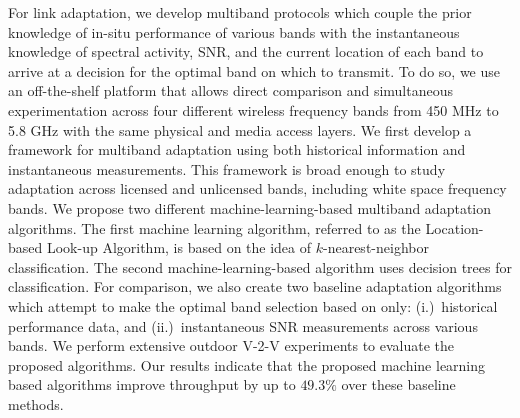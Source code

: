 For link adaptation, we develop multiband protocols which couple the prior knowledge 
of in-situ performance of various bands with the instantaneous knowledge of spectral 
activity, SNR, and the current location of each band to arrive at a decision for the 
optimal band on which to transmit. To do so, we use an off-the-shelf platform that 
allows direct comparison and simultaneous experimentation across four different 
wireless frequency bands from 450 MHz to 5.8 GHz with the same physical and media 
access layers. We first develop a framework for multiband adaptation using both historical 
information and instantaneous measurements. This framework is broad enough to study 
adaptation across licensed and unlicensed bands, including white space frequency bands. 
We propose two different machine-learning-based multiband adaptation algorithms. The 
first machine learning algorithm, referred to as the Location-based Look-up Algorithm, 
is based on the idea of $k$-nearest-neighbor classification. The second machine-learning-based 
algorithm uses decision trees for classification. For comparison, we also create two 
baseline adaptation algorithms which attempt to make the optimal band selection based on 
only: (i.)~historical performance data, and (ii.)~instantaneous SNR measurements across 
various bands. We perform extensive outdoor V-2-V experiments to evaluate the proposed 
algorithms. Our results indicate that the proposed machine learning based algorithms 
improve throughput by up to $49.3\%$ over these baseline methods.

